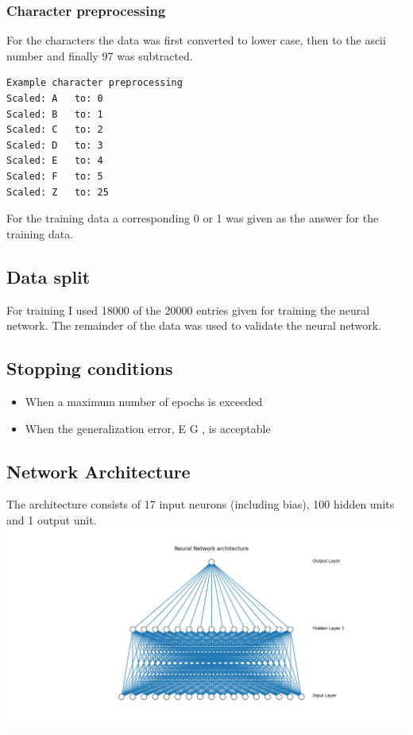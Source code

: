 \documentclass[11pt]{article}
\makeatletter
\def\maxwidth{\ifdim\Gin@nat@width>\linewidth\linewidth
    \else\Gin@nat@width\fi}
\let\Oldincludegraphics\includegraphics
\renewcommand{\includegraphics}[1]{\Oldincludegraphics[width=.8\maxwidth]{#1}}
\providecommand{\tightlist}{%
      \setlength{\itemsep}{0pt}\setlength{\parskip}{0pt}}
\makeatother
\begin{document}
\hypertarget{character-preprocessing}{%
\subsubsection{Character preprocessing}\label{character-preprocessing}}

For the characters the data was first converted to lower case, then to
the ascii number and finally 97 was subtracted.

\begin{verbatim}
Example character preprocessing
Scaled: A   to: 0
Scaled: B   to: 1
Scaled: C   to: 2
Scaled: D   to: 3
Scaled: E   to: 4
Scaled: F   to: 5
Scaled: Z   to: 25
\end{verbatim}

For the training data a corresponding 0 or 1 was given as the answer for
the training data.

    \hypertarget{data-split}{%
\subsection{Data split}\label{data-split}}

For training I used 18000 of the 20000 entries given for training the
neural network. The remainder of the data was used to validate the
neural network.

\hypertarget{stopping-conditions}{%
\subsection{Stopping conditions}\label{stopping-conditions}}

\begin{itemize}
\tightlist
\item
  When a maximum number of epochs is exceeded
\item
  When the generalization error, E G , is acceptable
\end{itemize}

\hypertarget{network-architecture}{%
\subsection{Network Architecture}\label{network-architecture}}

The architecture consists of 17 input neurons (including bias), 100
hidden units and 1 output unit. \includegraphics{Experiment2NN.png}
\end{document}
